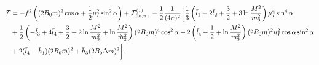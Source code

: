 \begin{align*}
    \mathcal{F} &=
    - f^2 \left((2 B_0 m)^2 \cos \alpha + \frac{1}{2}\mu_I^2 \sin^2 \alpha\right)
    + \mathcal{F}^{(1)}_{\mathrm{fin}, \pi_\pm}
    - \frac{1}{2}\frac{1}{(4 \pi)^2}
    \bigg[
        \frac{1}{3}
        \left( 
            \bar l_1 + 2 \bar l_2 + \frac{3}{2} + 3 \ln \frac{M^2}{m_3^2}
        \right) \mu_I^4 \sin^4 \alpha
        \\ 
        &
        +
        \frac{1}{2}
        \left(
            - \bar l_3 + 4 \bar l_4 + \frac{3}{2} + 2\ln \frac{M^2}{m_3^2}
            + \ln \frac{M^2}{\tilde m^2_2}
        \right) (2 B_0 m)^4 \cos^2\alpha 
        + 2 \left(\bar l_4 - \frac{1}{2} + \ln \frac{M^2}{m_3^2}\right)
        (2 B_0 m)^2 \mu_I^2 \cos\alpha \sin^2 \alpha
        \\
        & 
        + 2 (\bar l_4 - \bar h_1) (2B_0 \bar m )^2
        + \bar h_3 (2B_0 \Delta m)^2
    \bigg].
\end{align*}